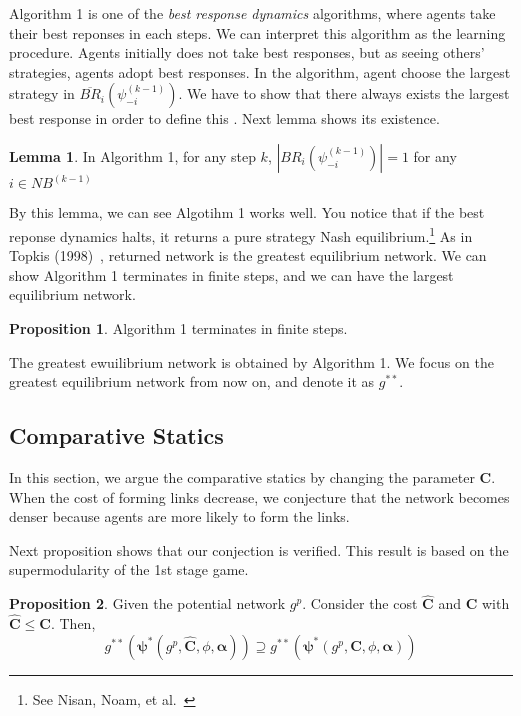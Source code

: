 \documentclass[12pt]{article}
\theoremstyle{definition}
\newtheorem{lemma}{Lemma}
\newtheorem{proposition}{Proposition}
\newcommand{\bm}[1]{\boldsymbol{#1}}
\begin{document}
Algorithm 1 is one of the {\it{best response dynamics}} algorithms, where agents take their best reponses in each steps.
We can interpret this algorithm as the learning procedure.
Agents initially does not take best responses, but as seeing others' strategies, agents adopt best responses.
In the algorithm, agent choose the largest strategy in $\overline{BR}_i(\psi_{-i}^{(k-1)})$.
We have to show that there always exists the largest best response in order to define this .
Next lemma shows its existence.

\begin{lemma}
In Algorithm 1, for any step $k$, $|BR_i(\psi_{-i}^{(k-1)})| = 1$ for any $i \in NB^{(k-1)}$
\end{lemma}

By this lemma, we can see Algotihm 1 works well.
You notice that if the best reponse dynamics halts, it returns a pure strategy Nash equilibrium.\footnote{See Nisan, Noam, et al.~\cite{AGT}}
As in Topkis (1998)~\cite{topkis1998}, returned network is the greatest equilibrium network.
We can show Algorithm 1 terminates in finite steps, and we can have the largest equilibrium network.

\begin{proposition}
Algorithm 1 terminates in finite steps.
\end{proposition}

The greatest ewuilibrium network is obtained by Algorithm 1.
We focus on the greatest equilibrium network from now on, and denote it as $g^{**}$.


\subsection{Comparative Statics}

In this section, we argue the comparative statics by changing the parameter $\bm{C}$.
When the cost of forming links decrease, we conjecture that the network becomes denser because agents are more likely to form the links.

Next proposition shows that our conjection is verified.
This result is based on the supermodularity of the 1st stage game.

\begin{proposition}
Given the potential network $g^p$.
Consider the cost $\bm{\hat{C}}$ and $\bm{C}$ with $\bm{\hat{C}} \le \bm{C}$.
Then,
\[ g^{**}(\bm{\psi}^*(g^p, \bm{\hat{C}}, \phi, \bm{\alpha})) \supseteq g^{**}(\bm{\psi}^*(g^p, \bm{C}, \phi, \bm{\alpha})) \]
\end{proposition}
\end{document}
